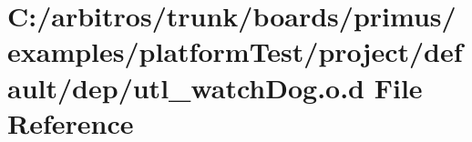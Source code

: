 \hypertarget{platform_test_2project_2default_2dep_2utl__watch_dog_8o_8d}{\section{C\-:/arbitros/trunk/boards/primus/examples/platform\-Test/project/default/dep/utl\-\_\-watch\-Dog.o.\-d File Reference}
\label{platform_test_2project_2default_2dep_2utl__watch_dog_8o_8d}
}
